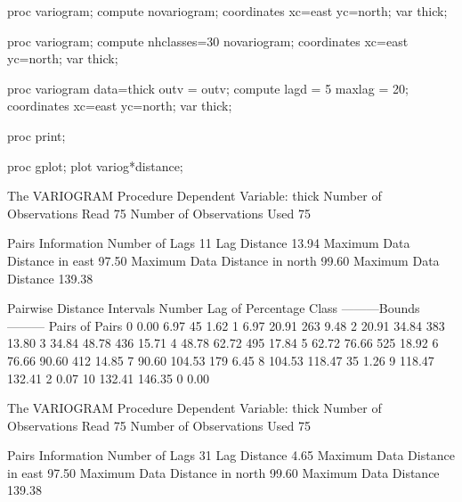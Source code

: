 \documentclass{article}
\begin{document}
\begin{Winput}
proc variogram;
    compute novariogram;
    coordinates xc=east yc=north;
    var thick;

proc variogram;
    compute nhclasses=30 novariogram;
    coordinates xc=east yc=north;
    var thick;

proc variogram data=thick outv = outv; 
  compute lagd = 5 maxlag = 20; 
  coordinates xc=east yc=north; 
  var thick;

proc print;

proc gplot;
    plot variog*distance;
\end{Winput}
\begin{Woutput}
The VARIOGRAM Procedure
Dependent Variable: thick
Number of Observations Read          75
Number of Observations Used          75

              Pairs Information
Number of Lags                              11
Lag Distance                             13.94
Maximum Data Distance in east            97.50
Maximum Data Distance in north           99.60
Maximum Data Distance                   139.38

               Pairwise Distance Intervals
                                     Number
  Lag                                    of    Percentage
Class    ---------Bounds---------     Pairs      of Pairs
    0          0.00          6.97        45        1.62%
    1          6.97         20.91       263        9.48%
    2         20.91         34.84       383       13.80%
    3         34.84         48.78       436       15.71%
    4         48.78         62.72       495       17.84%
    5         62.72         76.66       525       18.92%
    6         76.66         90.60       412       14.85%
    7         90.60        104.53       179        6.45%
    8        104.53        118.47        35        1.26%
    9        118.47        132.41         2        0.07%
   10        132.41        146.35         0        0.00%

The VARIOGRAM Procedure
Dependent Variable: thick
Number of Observations Read          75
Number of Observations Used          75

              Pairs Information
Number of Lags                              31
Lag Distance                              4.65
Maximum Data Distance in east            97.50
Maximum Data Distance in north           99.60
Maximum Data Distance                   139.38


\end{Woutput}
\end{document}
